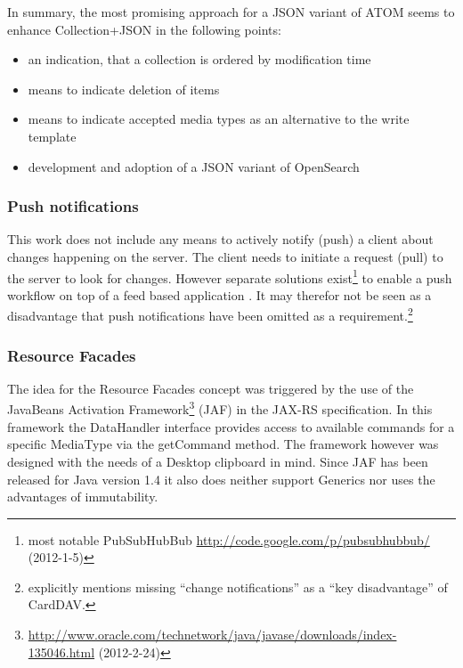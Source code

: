 \documentclass[11pt,a4paper,headsepline,twoside]{scrartcl}		%
\newcommand{\citeurl}[2]{\url{#1} (#2)}
\begin{document}
In summary, the most promising approach for a JSON variant of ATOM seems to
enhance Collection+JSON in the following points:

\begin{itemize}
\item an indication, that a collection is ordered by modification time
\item means to indicate deletion of items
\item means to indicate accepted media types as an alternative to the write
  template
\item development and adoption of a JSON variant of OpenSearch
\end{itemize}


\subsubsection{Push notifications}

This work does not include any means to actively notify (push) a client about
changes happening on the server. The client needs to initiate a request (pull)
to the server to look for changes. However separate solutions
exist\footnote{most notable PubSubHubBub
  \citeurl{http://code.google.com/p/pubsubhubbub/}{2012-1-5}} to enable a push
workflow on top of a feed based
application \cite{Wilde:2009:FQP:1693155.1693220}. It may therefor not be seen as
a disadvantage that push notifications have been omitted as a
requirement.\footnote{\cite[sec. 1]{RFC6352} explicitly mentions missing
  ``change notifications'' as a ``key disadvantage'' of CardDAV.}

\subsubsection{Resource Facades}
\label{sec:resourcefacadesfuture-work}

The idea for the Resource Facades concept was triggered by the use of the
JavaBeans Activation
Framework\footnote{\citeurl{http://www.oracle.com/technetwork/java/javase/downloads/index-135046.html}{2012-2-24}}
(JAF) in the JAX-RS specification. In this framework the DataHandler interface
provides access to available commands for a specific MediaType via the
getCommand method. The framework however was designed with the needs of a
Desktop clipboard in mind. Since JAF has been released for Java version 1.4 it
also does neither support Generics nor uses the advantages of immutability.
\end{document}
